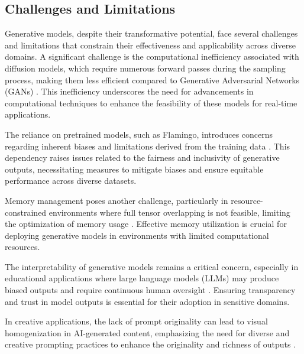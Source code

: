 \subsection{Challenges and Limitations} \label{subsec:Challenges and Limitations}

Generative models, despite their transformative potential, face several challenges and limitations that constrain their effectiveness and applicability across diverse domains. A significant challenge is the computational inefficiency associated with diffusion models, which require numerous forward passes during the sampling process, making them less efficient compared to Generative Adversarial Networks (GANs) \cite{dhariwal2021diffusion}. This inefficiency underscores the need for advancements in computational techniques to enhance the feasibility of these models for real-time applications.



The reliance on pretrained models, such as Flamingo, introduces concerns regarding inherent biases and limitations derived from the training data \cite{alayrac2022flamingo}. This dependency raises issues related to the fairness and inclusivity of generative outputs, necessitating measures to mitigate biases and ensure equitable performance across diverse datasets.



Memory management poses another challenge, particularly in resource-constrained environments where full tensor overlapping is not feasible, limiting the optimization of memory usage \cite{zheng2024vmcucoordinatedmemorymanagement}. Effective memory utilization is crucial for deploying generative models in environments with limited computational resources.



The interpretability of generative models remains a critical concern, especially in educational applications where large language models (LLMs) may produce biased outputs and require continuous human oversight \cite{kasneci2023chatgpt}. Ensuring transparency and trust in model outputs is essential for their adoption in sensitive domains.



In creative applications, the lack of prompt originality can lead to visual homogenization in AI-generated content, emphasizing the need for diverse and creative prompting practices to enhance the originality and richness of outputs \cite{palmini2024patternscreativityuserinput}.



